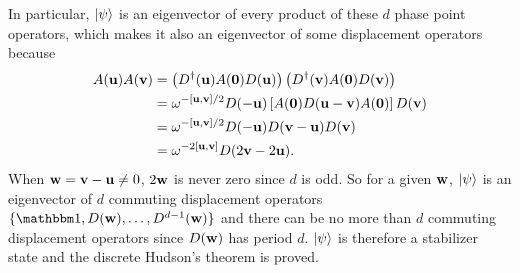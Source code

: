 \noindent In particular, ${\left\vert{\psi}\right\rangle}$ is an eigenvector of every product of these $d$ phase point operators, which makes it also an eigenvector of some displacement operators because
\begin{align}\label{phase-point-clifford}
	A({\bf u}) A({\bf v})
		&= \left( D\dgg ({\bf u}) A({\bf 0}) D ({\bf u}) \right)
			\left( D\dgg ({\bf v}) A({\bf 0}) D ({\bf v}) \right) \nonumber \\
		&= \omega^{-[{\bf u,v}]/2} D({\bf -u})	\left[ A({\bf 0}) D ({\bf u-v}) A({\bf 0}) \right] D ({\bf v}) \nonumber \\
		&= \omega^{-[{\bf u,v}]/2} D({\bf -u})D ({\bf v-u}) D ({\bf v}) \nonumber \\
		&= \omega^{-2 [{\bf u,v}]} D(2{\bf v} - 2{\bf u}).
\end{align}
When ${\bf w = v-u} \neq 0$, $2{\bf w}$ is never zero since $d$ is odd. So for a given ${\bf w}$, ${\left\vert{\psi}\right\rangle}$ is an eigenvector of $d$ commuting displacement operators $\{ \id, D({\bf w}), \dots, D^{d-1}({\bf w}) \}$ and there can be no more than $d$ commuting displacement operators since $D({\bf w})$ has period $d$. ${\left\vert{\psi}\right\rangle}$ is therefore a stabilizer state and the discrete Hudson's theorem is proved. 